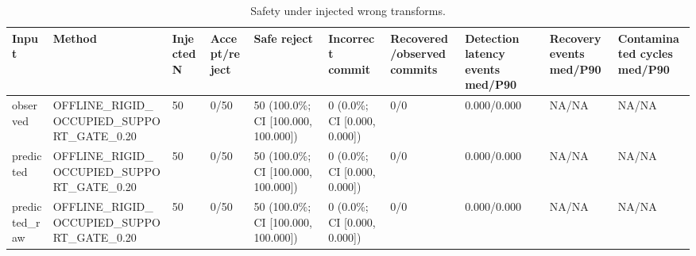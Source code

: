 \begin{table}[t]
\centering
\small
\caption{Safety under injected wrong transforms.}
\label{tab:transform-injection}
\begin{tabular}{llllllllll}
\toprule
Input & Method & Injected N & Accept/reject & Safe reject & Incorrect commit & Recovered/observed commits & Detection latency events med/P90 & Recovery events med/P90 & Contaminated cycles med/P90 \\
\midrule
observed & OFFLINE\_RIGID\_OCCUPIED\_SUPPORT\_GATE\_0.20 & 50 & 0/50 & 50 (100.0\%; CI [100.000, 100.000]) & 0 (0.0\%; CI [0.000, 0.000]) & 0/0 & 0.000/0.000 & NA/NA & NA/NA \\
predicted & OFFLINE\_RIGID\_OCCUPIED\_SUPPORT\_GATE\_0.20 & 50 & 0/50 & 50 (100.0\%; CI [100.000, 100.000]) & 0 (0.0\%; CI [0.000, 0.000]) & 0/0 & 0.000/0.000 & NA/NA & NA/NA \\
predicted\_raw & OFFLINE\_RIGID\_OCCUPIED\_SUPPORT\_GATE\_0.20 & 50 & 0/50 & 50 (100.0\%; CI [100.000, 100.000]) & 0 (0.0\%; CI [0.000, 0.000]) & 0/0 & 0.000/0.000 & NA/NA & NA/NA \\
\bottomrule
\end{tabular}
\end{table}
